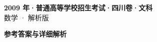 \documentclass[zihao=-4, a4paper]{ctexart}
\begin{document}
\begin{center}
  {\Large\bfseries 2009 年·普通高等学校招生考试·四川卷·文科}\\[4pt]
  {\large 数学 · 解析版}
\end{center}
\medskip
{}

\clearpage
{}
\begin{center}{\Large\bfseries 参考答案与详细解析}\end{center}
\medskip

\end{document}
